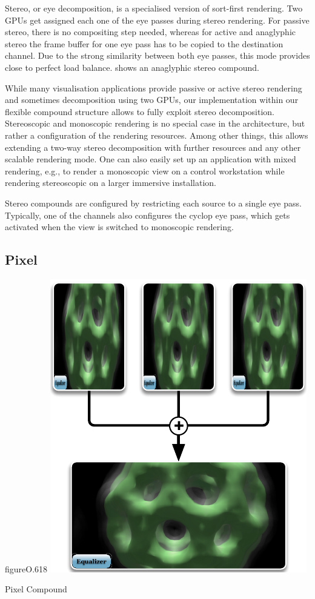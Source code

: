 Stereo, or eye decomposition, is a specialised version of sort-first rendering.
Two GPUs get assigned each one of the eye passes during stereo rendering. For
passive stereo, there is no compositing step needed, whereas for active and
anaglyphic stereo the frame buffer for one eye pass has to be copied to the
destination channel. Due to the strong similarity between both eye passes, this
mode provides close to perfect load balance.  shows an ana\-gly\-phic stereo compound.

While many visualisation applications provide passive or active stereo rendering and
sometimes decomposition using two GPUs, our implementation within our flexible
compound structure allows to fully exploit stereo decomposition.  Stereoscopic
and monoscopic rendering is no special case in the architecture, but rather a
configuration of the rendering resources. Among other things, this allows
extending a two-way stereo decomposition with further resources and any other
scalable rendering mode. One can also easily set up an application with mixed
rendering, e.g., to render a monoscopic view on a control workstation while
rendering stereoscopic on a larger immersive installation.

Stereo compounds are configured by restricting each source to a single eye
pass. Typically, one of the channels also configures the \textsf{cyclop} eye
pass, which gets activated when the view is switched to monoscopic rendering.


\subsection{Pixel}

\begin{wrapfloat}{figure}{O}{.618\textwidth}
 \includegraphics[width=.618\textwidth]{images/Pixel}
 {\caption{\label{fPixel}Pixel Compound}}
\end{wrapfloat}

